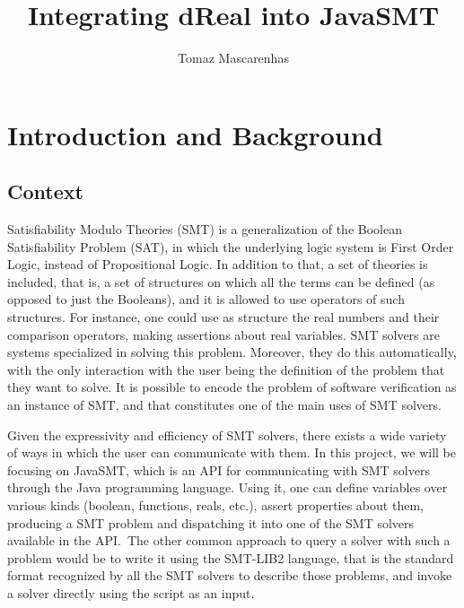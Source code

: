 \documentclass[a4paper,12pt]{article}
\title{Integrating dReal into JavaSMT}
\author{Tomaz Mascarenhas}
\begin{document}
\maketitle




\tableofcontents

\section{Introduction and Background}

\subsection*{Context}

Satisfiability Modulo Theories (SMT)  is a generalization of the Boolean Satisfiability
Problem (SAT), in which the underlying logic system is First Order Logic, instead of Propositional Logic. In addition to that, a set of theories is included, that is, a set of structures on
which all the terms can be defined (as opposed to just the Booleans), and it is allowed to use operators of such structures. For instance, one could use as structure the real numbers and
their comparison operators, making assertions about real variables. SMT solvers are systems
specialized in solving this problem. Moreover, they do this automatically, with the only interaction with the user being the definition of the problem that they want to solve. It is possible
to encode the problem of software verification as an instance of SMT, and that constitutes one
of the main uses of SMT solvers.

Given the expressivity and efficiency of SMT solvers, there exists a wide variety of ways in which the user can communicate with them. In this project, we will be focusing on JavaSMT, which is an API for communicating with SMT solvers through the Java programming language. Using it, one can define variables over various kinds (boolean, functions, reals, etc.), assert properties about them, producing a SMT problem and dispatching it into one of the SMT solvers available in the API.\ The other common approach to query a solver with such a problem would be to write it using the SMT-LIB2 language, that is the standard format recognized by all the SMT solvers to describe those problems, and invoke a solver directly using the script as an input.
\end{document}
